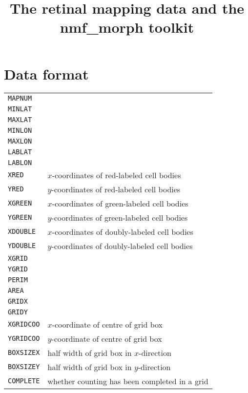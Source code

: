 \documentclass{article}
\title{The retinal mapping data and the nmf\_morph toolkit}
\begin{document}
\maketitle
\thispagestyle{myheadings}

\section{Data format}
\label{manual:sec:reading-data}

\begin{table}
  \begin{tabular}{ll}
    \texttt{MAPNUM}   & \\  
    \texttt{MINLAT}   & \\
    \texttt{MAXLAT}   & \\
    \texttt{MINLON}   & \\
    \texttt{MAXLON}   & \\
    \texttt{LABLAT}   & \\
    \texttt{LABLON}   & \\
    \texttt{XRED}     & $x$-coordinates of red-labeled cell bodies    \\
    \texttt{YRED}     & $y$-coordinates of red-labeled cell bodies    \\
    \texttt{XGREEN}   & $x$-coordinates of green-labeled cell bodies  \\
    \texttt{YGREEN}   & $y$-coordinates of green-labeled cell bodies  \\
    \texttt{XDOUBLE}  & $x$-coordinates of doubly-labeled cell bodies \\ 
    \texttt{YDOUBLE}  & $y$-coordinates of doubly-labeled cell bodies \\
    \texttt{XGRID}    & \\
    \texttt{YGRID}    & \\
    \texttt{PERIM}    & \\
    \texttt{AREA}     & \\
    \texttt{GRIDX}    & \\
    \texttt{GRIDY}    & \\
    \texttt{XGRIDCOO} & $x$-coordinate of centre of grid box \\
    \texttt{YGRIDCOO} & $y$-coordinate of centre of grid box \\
    \texttt{BOXSIZEX} & half width of grid box in $x$-direction \\
    \texttt{BOXSIZEY} & half width of grid box in $y$-direction \\
    \texttt{COMPLETE} & whether counting has been completed in a grid

\end{tabular}
\end{table}
\end{document}
